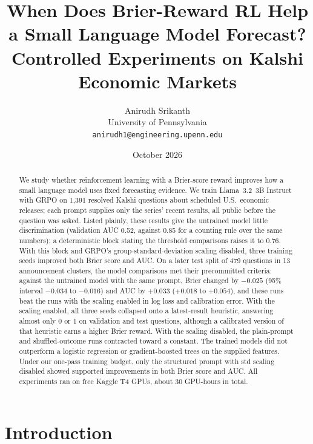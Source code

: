\documentclass[11pt]{article}
\title{When Does Brier-Reward RL Help a Small Language Model Forecast?\\
\large Controlled Experiments on Kalshi Economic Markets}
\author{Anirudh Srikanth\\University of Pennsylvania\\\texttt{anirudh1@engineering.upenn.edu}}
\date{October 2026}
\begin{document}
\maketitle

\begin{abstract}
We study whether reinforcement learning with a Brier-score reward improves how a small language model uses fixed forecasting evidence. We train Llama~3.2~3B Instruct with GRPO on 1,391 resolved Kalshi questions about scheduled U.S.\ economic releases; each prompt supplies only the series' recent results, all public before the question was asked. Listed plainly, these results give the untrained model little discrimination (validation AUC 0.52, against 0.85 for a counting rule over the same numbers); a deterministic block stating the threshold comparisons raises it to 0.76. With this block and GRPO's group-standard-deviation scaling disabled, three training seeds improved both Brier score and AUC. On a later test split of 479 questions in 13 announcement clusters, the model comparisons met their precommitted criteria: against the untrained model with the same prompt, Brier changed by $-0.025$ (95\% interval $-0.034$ to $-0.016$) and AUC by $+0.033$ ($+0.018$ to $+0.054$), and these runs beat the runs with the scaling enabled in log loss and calibration error. With the scaling enabled, all three seeds collapsed onto a latest-result heuristic, answering almost only 0 or 1 on validation and test questions, although a calibrated version of that heuristic earns a higher Brier reward. With the scaling disabled, the plain-prompt and shuffled-outcome runs contracted toward a constant. The trained models did not outperform a logistic regression or gradient-boosted trees on the supplied features. Under our one-pass training budget, only the structured prompt with std scaling disabled showed supported improvements in both Brier score and AUC. All experiments ran on free Kaggle T4 GPUs, about 30 GPU-hours in total.
\end{abstract}

\section{Introduction}
\end{document}
